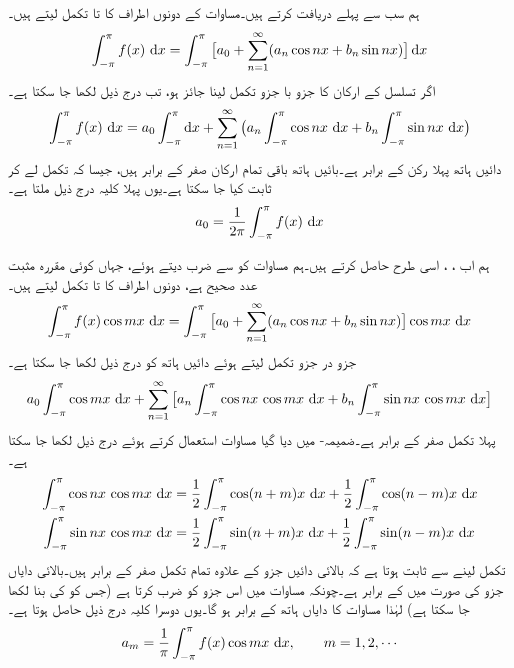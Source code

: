 ہم سب سے پہلے  دریافت کرتے ہیں۔مساوات  کے دونوں اطراف کا  تا  تکمل لیتے ہیں۔
\begin{align*}
\int_{-\pi}^{\pi}f(x)\,\dif x=\int_{-\pi}^{\pi}\big[a_0+\sum_{n=1}^{\infty}(a_n\cos nx+b_n\sin nx)\big]\dif x
\end{align*}
اگر تسلسل کے ارکان کا جزو با جزو تکمل لینا جائز ہو، تب درج ذیل لکھا جا سکتا ہے۔
\begin{align*}
\int_{-\pi}^{\pi}f(x)\,\dif x=a_0\int_{-\pi}^{\pi}\dif x+ \sum_{n=1}^{\infty}\big(a_n\int_{-\pi}^{\pi}\cos nx\,\dif x+b_n\int_{-\pi}^{\pi}\sin nx \,\dif x\big)
\end{align*}
دائیں ہاتھ پہلا رکن  کے برابر ہے۔بائیں ہاتھ باقی تمام ارکان صفر کے برابر ہیں، جیسا کہ تکمل لے کر ثابت کیا جا سکتا ہے۔یوں پہلا کلیہ درج ذیل ملتا ہے۔
\begin{align}\label{مساوات_فوریئر_تسلسل_ب}
a_0=\frac{1}{2\pi}\int_{-\pi}^{\pi}f(x)\,\dif x
\end{align}

ہم اب ، ،  اسی طرح حاصل کرتے ہیں۔ہم مساوات  کو  سے ضرب دیتے ہوئے، جہاں  کوئی مقررہ مثبت عدد صحیح ہے، دونوں اطراف کا  تا  تکمل لیتے ہیں۔
\begin{align}\label{مساوات_فوریئر_تسلسل_پ}
\int_{-\pi}^{\pi}f(x)\cos mx\,\dif x=\int_{-\pi}^{\pi}\big[a_0+\sum_{n=1}^{\infty}(a_n\cos nx+b_n\sin nx)\big]\cos mx\, \dif x
\end{align}
جزو در جزو تکمل لیتے ہوئے  دائیں ہاتھ کو درج ذیل لکھا جا سکتا ہے۔
\begin{align*}
a_0\int_{-\pi}^{\pi}\cos mx\,\dif x+\sum_{n=1}^{\infty}\big[a_n\int_{-\pi}^{\pi}\cos nx\,\cos mx\,\dif x+b_n\int_{-\pi}^{\pi}\sin nx\,\cos mx\,\dif x\big]
\end{align*}
پہلا تکمل صفر کے برابر ہے۔ضمیمہ- میں دیا گیا مساوات  استعمال کرتے ہوئے درج ذیل لکھا جا سکتا ہے۔
\begin{gather*}
\begin{aligned}
\int_{-\pi}^{\pi} \cos nx\,\cos mx\,\dif x&=\frac{1}{2}\int_{-\pi}^{\pi}\cos(n+m)x\,\dif x
+\frac{1}{2}\int_{-\pi}^{\pi} \cos (n-m)x\,\dif x\\
\int_{-\pi}^{\pi} \sin nx\,\cos mx\,\dif x&=\frac{1}{2}\int_{-\pi}^{\pi}\sin(n+m)x\,\dif x+\frac{1}{2}\int_{-\pi}^{\pi} \sin (n-m)x\,\dif x
\end{aligned}
\end{gather*}
تکمل لینے سے ثابت ہوتا ہے کہ بالائی دائیں جزو کے علاوہ تمام تکمل صفر کے برابر ہیں۔بالائی دایاں جزو  کی صورت میں  کے برابر ہے۔چونکہ مساوات  میں اس جزو کو  ضرب کرتا ہے (جس کو  کی بنا  لکھا جا سکتا ہے) لہٰذا مساوات  کا دایاں ہاتھ  کے برابر ہو گا۔یوں دوسرا کلیہ درج ذیل حاصل ہوتا ہے۔
\begin{align}\label{مساوات_فوریئر_تسلسل_ت}
a_m=\frac{1}{\pi}\int_{-\pi}^{\pi}f(x)\cos mx\,\dif x,\quad \quad m=1,2,\cdots
\end{align}

